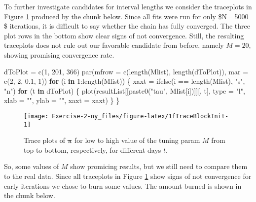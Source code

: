 \documentclass[
]{article}
\newenvironment{Shaded}{\begin{snugshade}}{\end{snugshade}}
\newcommand{\AttributeTok}[1]{\textcolor[rgb]{0.77,0.63,0.00}{#1}}
\newcommand{\ControlFlowTok}[1]{\textcolor[rgb]{0.13,0.29,0.53}{\textbf{#1}}}
\newcommand{\DecValTok}[1]{\textcolor[rgb]{0.00,0.00,0.81}{#1}}
\newcommand{\FloatTok}[1]{\textcolor[rgb]{0.00,0.00,0.81}{#1}}
\newcommand{\FunctionTok}[1]{\textcolor[rgb]{0.00,0.00,0.00}{#1}}
\newcommand{\NormalTok}[1]{#1}
\newcommand{\OtherTok}[1]{\textcolor[rgb]{0.56,0.35,0.01}{#1}}
\newcommand{\SpecialCharTok}[1]{\textcolor[rgb]{0.00,0.00,0.00}{#1}}
\newcommand{\StringTok}[1]{\textcolor[rgb]{0.31,0.60,0.02}{#1}}
\begin{document}
To further investigate candidates for interval lengths we consider the traceplots in Figure \ref{fig:1fTraceBlockInit} produced by the chunk below. Since all fits were run for only \$N= 5000 \$ iterations, it is difficult to say whether the chain has fully converged. The three plot rows in the bottom show clear signs of not convergence. Still, the resulting traceplots does not rule out our favorable candidate from before, namely \(M=20\), showing promising convergence rate.

\begin{Shaded}
\begin{Highlighting}[]
\NormalTok{dToPlot }\OtherTok{=} \FunctionTok{c}\NormalTok{(}\DecValTok{1}\NormalTok{, }\DecValTok{201}\NormalTok{, }\DecValTok{366}\NormalTok{)}
\FunctionTok{par}\NormalTok{(}\AttributeTok{mfrow =} \FunctionTok{c}\NormalTok{(}\FunctionTok{length}\NormalTok{(Mlist), }\FunctionTok{length}\NormalTok{(dToPlot)), }\AttributeTok{mar =} \FunctionTok{c}\NormalTok{(}\DecValTok{2}\NormalTok{, }\DecValTok{2}\NormalTok{, }\FloatTok{0.1}\NormalTok{, }\DecValTok{1}\NormalTok{))}
\ControlFlowTok{for}\NormalTok{ (i }\ControlFlowTok{in} \DecValTok{1}\SpecialCharTok{:}\FunctionTok{length}\NormalTok{(Mlist)) \{}
\NormalTok{    xaxt }\OtherTok{=} \FunctionTok{ifelse}\NormalTok{(i }\SpecialCharTok{==} \FunctionTok{length}\NormalTok{(Mlist), }\StringTok{"s"}\NormalTok{, }\StringTok{"n"}\NormalTok{)}
    \ControlFlowTok{for}\NormalTok{ (t }\ControlFlowTok{in}\NormalTok{ dToPlot) \{}
        \FunctionTok{plot}\NormalTok{(resultList[[}\FunctionTok{paste0}\NormalTok{(}\StringTok{"tau"}\NormalTok{, Mlist[i])]][, t], }\AttributeTok{type =} \StringTok{"l"}\NormalTok{, }\AttributeTok{xlab =} \StringTok{""}\NormalTok{, }\AttributeTok{ylab =} \StringTok{""}\NormalTok{,}
            \AttributeTok{xaxt =}\NormalTok{ xaxt)}
\NormalTok{    \}}
\NormalTok{\}}
\end{Highlighting}
\end{Shaded}

\begin{figure}

{\centering \texttt{[image: Exercise-2-ny\_files/figure-latex/1fTraceBlockInit-1]} 

}

\caption{Trace plots of $\boldsymbol{\pi}$ for low to high value of the tuning param $M$ from top to bottom, respectively, for different days $t$.}\label{fig:1fTraceBlockInit}
\end{figure}

So, some values of \(M\) show promicing results, but we still need to compare them to the real data. Since all traceplots in Figure \ref{fig:1fTraceBlockInit} show signs of not convergence for early iterations we chose to burn some values. The amount burned is shown in the chunk below.
\end{document}
